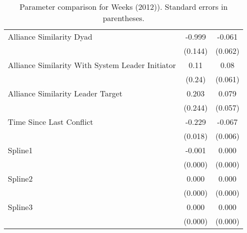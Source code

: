 \begin{table}[ht]
\begin{tabular}{lcc}
  Alliance Similarity Dyad  & -0.999 & -0.061 \\
   & (0.144) & (0.062) \\
  Alliance Similarity With System Leader Initiator & 0.11 & 0.08 \\
   & (0.24) & (0.061) \\
  Alliance Similarity Leader Target & 0.203 & 0.079 \\
   & (0.244) & (0.057) \\
  Time Since Last Conflict & -0.229 & -0.067 \\
   & (0.018) & (0.006) \\
  Spline1 & -0.001 & 0.000 \\
   & (0.000) & (0.000) \\
  Spline2 & 0.000 & 0.000 \\
   & (0.000) & (0.000) \\
  Spline3 & 0.000 & 0.000 \\
   & (0.000) & (0.000) \\
   \hline
\hline
\end{tabular}
\endgroup
\caption{Parameter comparison for Weeks (2012)). Standard errors in parentheses.}
\label{tab:appendix_tableB2_coef}
\end{table}
